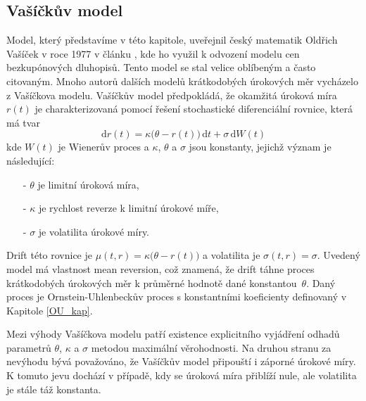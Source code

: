 \documentclass[a4paper,12pt]{report}
\theoremstyle{definition} \newtheorem{definice}[veta]{Definice}
\theoremstyle{remark}
\begin{document}
\subsection{Vašíčkův model}\label{Vasickuv_model_kap}
Model, který představíme v této kapitole, uveřejnil český matematik Oldřich Vašíček v roce 1977 v článku \cite{vasicek1977equilibrium}, kde ho využil k odvození modelu cen bezkupónových dluhopisů.
Tento model se stal velice oblíbeným a často citovaným.
Mnoho autorů dalších modelů krátkodobých úrokových měr vycházelo z Vašíčkova modelu.
Vašíčkův model předpokládá, že okamžitá úroková míra $r(t)$ je charakterizovaná pomocí řešení stochastické diferenciální rovnice, která má tvar
\begin{equation}\label{Vasickuv_model}
\mathrm{d}r(t) = \kappa\big(\theta - r(t)\big)\,\mathrm{d}t + \sigma\,\mathrm{d}W(t)
\end{equation}
kde $W(t)$ je Wienerův proces a $\kappa$, $\theta$ a $\sigma$ jsou konstanty, jejichž význam je následující:
\begin{itemize}
\item[-] $\theta$ je limitní úroková míra, 
\item[-] $\kappa$ je rychlost reverze k limitní úrokové míře, 
\item[-] $\sigma$ je volatilita úrokové míry.
\end{itemize}

Drift této rovnice je $\mu(t, r) = \kappa\big ( \theta - r(t)\big)$ a volatilita je $\sigma(t, r) = \sigma$. 
Uvedený model má vlastnost mean reversion, což znamená, že drift táhne proces krátkodobých úrokových měr k průměrné hodnotě dané konstantou~$\theta$. 
Daný proces je Ornstein-Uhlenbeckův proces s konstantními koeficienty definovaný v Kapitole \ref{OU_kap}.

Mezi výhody Vašíčkova modelu patří existence explicitního vyjádření odhadů parametrů $\theta$, $\kappa$ a  $\sigma$ metodou maximální věrohodnosti.
Na druhou stranu za nevýhodu bývá považováno, že Vašíčkův model připouští i záporné úrokové míry. 
K tomuto jevu dochází v případě, kdy se úroková míra přiblíží nule, ale volatilita je stále táž konstanta.
\end{document}
